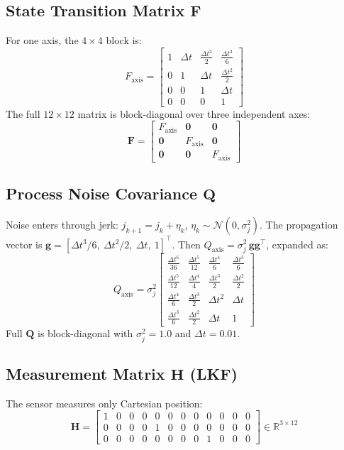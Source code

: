\documentclass[12pt,a4paper]{article}
\newcommand{\bF}{\mathbf{F}}
\newcommand{\bQ}{\mathbf{Q}}
\newcommand{\bH}{\mathbf{H}}
\begin{document}
\subsection{State Transition Matrix \texorpdfstring{$\mathbf{F}$}{F}}
For one axis, the $4\times4$ block is:
\[
    F_{\text{axis}} = \begin{bmatrix}
        1 & \Delta t & \frac{\Delta t^2}{2} & \frac{\Delta t^3}{6} \\
        0 & 1        & \Delta t             & \frac{\Delta t^2}{2} \\
        0 & 0        & 1                    & \Delta t             \\
        0 & 0        & 0                    & 1
    \end{bmatrix}
\]
The full $12\times12$ matrix is block-diagonal over three independent axes:
\[
    \bF = \begin{bmatrix} F_{\text{axis}} & \mathbf{0} & \mathbf{0} \\
                          \mathbf{0} & F_{\text{axis}} & \mathbf{0} \\
                          \mathbf{0} & \mathbf{0} & F_{\text{axis}} \end{bmatrix}
\]

\subsection{Process Noise Covariance \texorpdfstring{$\mathbf{Q}$}{Q}}
Noise enters through jerk: $j_{k+1} = j_k + \eta_k$, $\eta_k \sim \mathcal{N}(0,\sigma_j^2)$.
The propagation vector is $\mathbf{g} = [\Delta t^3/6,\ \Delta t^2/2,\ \Delta t,\ 1]^\top$.
Then $Q_{\text{axis}} = \sigma_j^2\, \mathbf{g}\mathbf{g}^\top$, expanded as:
\[
    Q_{\text{axis}} = \sigma_j^2
    \begin{bmatrix}
        \frac{\Delta t^6}{36} & \frac{\Delta t^5}{12} & \frac{\Delta t^4}{6}  & \frac{\Delta t^3}{6}  \\
        \frac{\Delta t^5}{12} & \frac{\Delta t^4}{4}  & \frac{\Delta t^3}{2}  & \frac{\Delta t^2}{2}  \\
        \frac{\Delta t^4}{6}  & \frac{\Delta t^3}{2}  & \Delta t^2            & \Delta t              \\
        \frac{\Delta t^3}{6}  & \frac{\Delta t^2}{2}  & \Delta t              & 1
    \end{bmatrix}
\]
Full $\bQ$ is block-diagonal with $\sigma_j^2 = 1.0$ and $\Delta t = 0.01$.

\subsection{Measurement Matrix \texorpdfstring{$\mathbf{H}$}{H} (LKF)}
The sensor measures only Cartesian position:
\[
    \bH = \begin{bmatrix}
        1 & 0 & 0 & 0 & 0 & 0 & 0 & 0 & 0 & 0 & 0 & 0 \\
        0 & 0 & 0 & 0 & 1 & 0 & 0 & 0 & 0 & 0 & 0 & 0 \\
        0 & 0 & 0 & 0 & 0 & 0 & 0 & 0 & 1 & 0 & 0 & 0
    \end{bmatrix} \in \mathbb{R}^{3\times12}
\]
\end{document}
